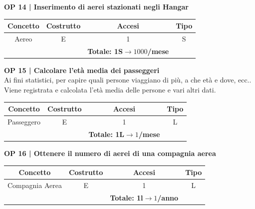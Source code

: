 
\textbf{\small OP 14 | Inserimento di aerei stazionati negli Hangar}\\

\begin{tabular}{ c c c c}
	\hline
	\textbf{Concetto} & \textbf{Costrutto} & \textbf{Accesi} & \textbf{Tipo}\\
	\hline
	\textsf{\small Aereo} & \textsf{\small E} & \textsf{\small 1} &  \textsf{\small S}\\
	\hline
	\textsf{\small } & \textsf{\small } & \textbf{Totale: 1S$\rightarrow 1000$/mese } \textsf{\small } & \textsf{\small }\\ %
	\hline
\end{tabular}

\vspace{.6cm}


\textbf{\small OP 15 | Calcolare l'età media dei passeggeri}\\

\textsf{\small Ai fini statistici, per capire quali persone viaggiano di più, a che età e dove, ecc.. Viene registrata e calcolata l'età media delle persone e vari altri dati.}\break

\begin{tabular}{ c c c c}
	\hline
	\textbf{Concetto} & \textbf{Costrutto} & \textbf{Accesi} & \textbf{Tipo}\\
	\hline
	\textsf{\small Passeggero} & \textsf{\small E} & \textsf{\small 1} &  \textsf{\small L}\\
	\hline
	\textsf{\small } & \textsf{\small } & \textbf{Totale: 1L$\rightarrow 1$/mese } \textsf{\small } & \textsf{\small }\\
	\hline
\end{tabular}

\vspace{.6cm}


\textbf{\small OP 16 | Ottenere il numero di aerei di una compagnia aerea}\\

\begin{tabular}{ c c c c}
	\hline
	\textbf{Concetto} & \textbf{Costrutto} & \textbf{Accesi} & \textbf{Tipo}\\
	\hline
	\textsf{\small Compagnia Aerea} & \textsf{\small E} & \textsf{\small 1} &  \textsf{\small L}\\
	\hline
	\textsf{\small } & \textsf{\small } & \textbf{Totale: 1l$\rightarrow 1$/anno } \textsf{\small } & \textsf{\small }\\
	\hline
\end{tabular}

